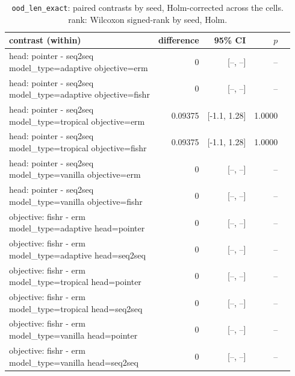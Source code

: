 \documentclass[10pt]{article}
\begin{document}
{\small
\begin{longtable}{lrrrl}
\caption{\texttt{ood\_len\_exact}: paired contrasts by seed, Holm-corrected across the cells. rank: Wilcoxon signed-rank by seed, Holm.}\label{tab:paired-ood_len_exact}\\
\toprule
contrast (within) & difference & 95\% CI & $p$ & \\
\midrule
\endhead
\makecell[l]{head: pointer - seq2seq\\\footnotesize model\_type=adaptive objective=erm } & 0 & [--, --] & -- & \\
\makecell[l]{head: pointer - seq2seq\\\footnotesize model\_type=adaptive objective=fishr } & 0 & [--, --] & -- & \\
\makecell[l]{head: pointer - seq2seq\\\footnotesize model\_type=tropical objective=erm } & 0.09375 & [-1.1, 1.28] & 1.0000 & \\
\makecell[l]{head: pointer - seq2seq\\\footnotesize model\_type=tropical objective=fishr } & 0.09375 & [-1.1, 1.28] & 1.0000 & \\
\makecell[l]{head: pointer - seq2seq\\\footnotesize model\_type=vanilla objective=erm } & 0 & [--, --] & -- & \\
\makecell[l]{head: pointer - seq2seq\\\footnotesize model\_type=vanilla objective=fishr } & 0 & [--, --] & -- & \\
\makecell[l]{objective: fishr - erm\\\footnotesize model\_type=adaptive head=pointer } & 0 & [--, --] & -- & \\
\makecell[l]{objective: fishr - erm\\\footnotesize model\_type=adaptive head=seq2seq } & 0 & [--, --] & -- & \\
\makecell[l]{objective: fishr - erm\\\footnotesize model\_type=tropical head=pointer } & 0 & [--, --] & -- & \\
\makecell[l]{objective: fishr - erm\\\footnotesize model\_type=tropical head=seq2seq } & 0 & [--, --] & -- & \\
\makecell[l]{objective: fishr - erm\\\footnotesize model\_type=vanilla head=pointer } & 0 & [--, --] & -- & \\
\makecell[l]{objective: fishr - erm\\\footnotesize model\_type=vanilla head=seq2seq } & 0 & [--, --] & -- & \\
\bottomrule
\end{longtable}
}
\end{document}
